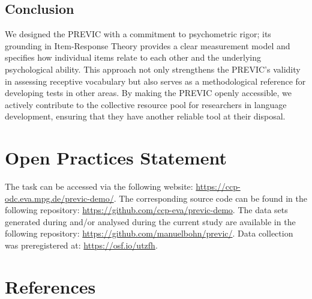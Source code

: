 \documentclass[
  man,floatsintext]{apa6}
\begin{document}
\hypertarget{conclusion}{%
\subsection{Conclusion}\label{conclusion}}

We designed the PREVIC with a commitment to psychometric rigor; its grounding in Item-Response Theory provides a clear measurement model and specifies how individual items relate to each other and the underlying psychological ability. This approach not only strengthens the PREVIC's validity in assessing receptive vocabulary but also serves as a methodological reference for developing tests in other areas. By making the PREVIC openly accessible, we actively contribute to the collective resource pool for researchers in language development, ensuring that they have another reliable tool at their disposal.

\hypertarget{open-practices-statement}{%
\section{Open Practices Statement}\label{open-practices-statement}}

The task can be accessed via the following website: \url{https://ccp-odc.eva.mpg.de/previc-demo/}. The corresponding source code can be found in the following repository: \url{https://github.com/ccp-eva/previc-demo}. The data sets generated during and/or analysed during the current study are available in the following repository: \url{https://github.com/manuelbohn/previc/}. Data collection was preregistered at: \url{https://osf.io/utzfh}.

\newpage

\hypertarget{references}{%
\section{References}\label{references}}
\end{document}
